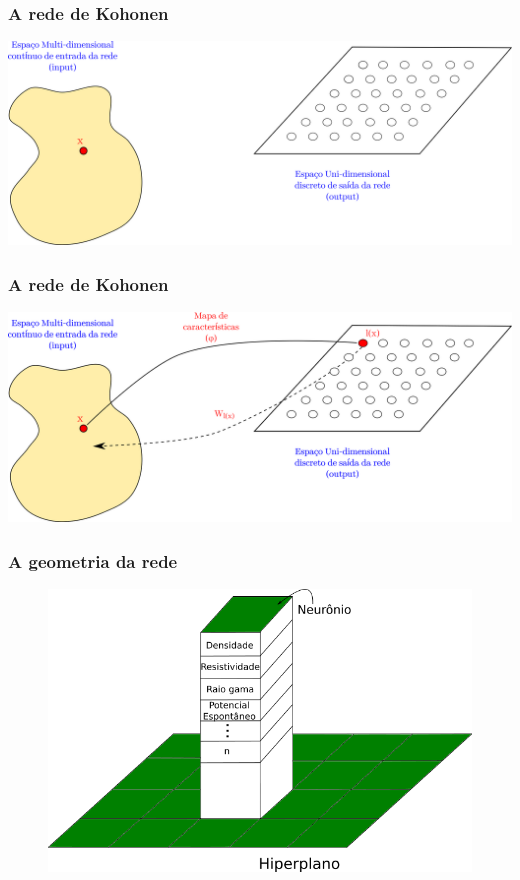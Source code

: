 \documentclass[10pt]{beamer} %
\begin{document}
\begin{frame}
	\frametitle{A rede de Kohonen}
	\includegraphics[scale=0.5]{Imagens/IntroKoho3.png} 
	
\end{frame}

\begin{frame}
	\frametitle{A rede de Kohonen}
	\includegraphics[scale=0.5]{Imagens/IntroKoho4.png} 
	
\end{frame}


\begin{frame}
	\frametitle{A geometria da rede}
\begin{figure}[H]
	\centering
		\includegraphics[scale=0.5]{Imagens/hiperplano.png}
	\label{hiperplano}
\end{figure}

\end{frame}
\end{document}
